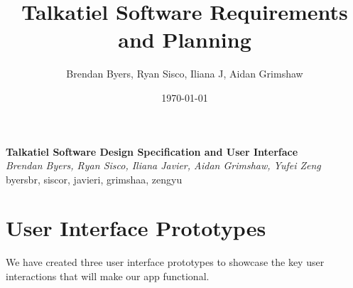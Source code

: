 \documentclass[12pt]{article}
\title{Talkatiel Software Requirements and Planning}
\author{Brendan Byers, Ryan Sisco, Iliana J, Aidan Grimshaw}
\date{\today}
\begin{document}
\begin{center}
      \Large\textbf{Talkatiel Software Design Specification and User Interface}\\
      \large\textit{Brendan Byers, Ryan Sisco, Iliana Javier, Aidan Grimshaw, Yufei Zeng}\\
      \large{byersbr, siscor, javieri, grimshaa, zengyu}\\
   \end{center}

\tableofcontents

\section{User Interface Prototypes}
We have created three user interface prototypes to showcase the key user interactions that will make our app functional.
\end{document}
